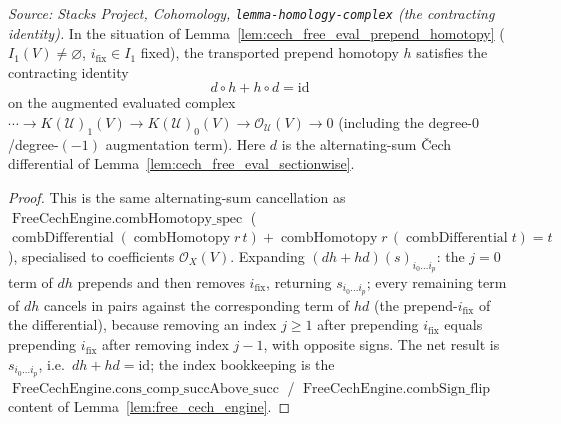 \begin{lemma}
  \label{lem:cech_free_eval_prepend_homotopy_spec}
  \textit{Source: Stacks Project, Cohomology, \texttt{lemma-homology-complex}
  (the contracting identity).}
  In the situation of Lemma~\ref{lem:cech_free_eval_prepend_homotopy}
  (\(I_1(V) \neq \varnothing\), \(i_{\mathrm{fix}} \in I_1\) fixed), the transported
  prepend homotopy \(h\) satisfies the contracting identity
  \[
    d \circ h + h \circ d = \mathrm{id}
  \]
  on the augmented evaluated complex
  \(\cdots \to K(\mathcal{U})_1(V) \to K(\mathcal{U})_0(V) \to
  \mathcal{O}_{\mathcal{U}}(V) \to 0\) (including the degree-\(0\)/degree-\((-1)\)
  augmentation term). Here \(d\) is the alternating-sum {\v C}ech differential of
  Lemma~\ref{lem:cech_free_eval_sectionwise}.
\end{lemma}

\begin{proof}
  This is the same alternating-sum cancellation as
  \(\operatorname{FreeCechEngine.combHomotopy\_spec}\)
  (\(\operatorname{combDifferential}(\operatorname{combHomotopy} r\, t) +
  \operatorname{combHomotopy} r\, (\operatorname{combDifferential} t) = t\)),
  specialised to coefficients \(\mathcal{O}_X(V)\). Expanding
  \((dh + hd)(s)_{i_0 \ldots i_p}\): the \(j = 0\) term of \(dh\) prepends and then
  removes \(i_{\mathrm{fix}}\), returning \(s_{i_0 \ldots i_p}\); every remaining term
  of \(dh\) cancels in pairs against the corresponding term of \(hd\) (the
  prepend-\(i_{\mathrm{fix}}\) of the differential), because removing an index
  \(j \geq 1\) after prepending \(i_{\mathrm{fix}}\) equals prepending
  \(i_{\mathrm{fix}}\) after removing index \(j-1\), with opposite signs. The net
  result is \(s_{i_0 \ldots i_p}\), i.e.\ \(dh + hd = \mathrm{id}\); the index
  bookkeeping is the \(\operatorname{FreeCechEngine.cons\_comp\_succAbove\_succ}\) /
  \(\operatorname{FreeCechEngine.combSign\_flip}\) content of
  Lemma~\ref{lem:free_cech_engine}.
\end{proof}

